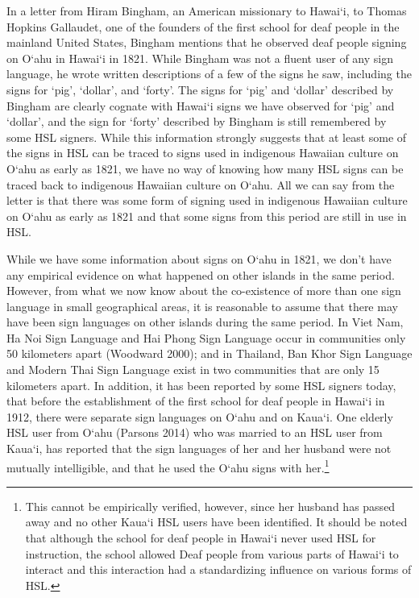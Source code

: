 \documentclass{tufte-book}
\begin{document}
In a letter from Hiram Bingham, an American missionary to Hawai‘i, to Thomas Hopkins Gallaudet, one of the founders of the first school for deaf people in the mainland United States, Bingham mentions that he observed deaf people signing on O‘ahu in Hawai‘i in 1821. While Bingham was not a fluent user of any sign language, he wrote written descriptions of a few of the signs he saw, including the signs for `pig', `dollar', and `forty'. The signs for `pig' and `dollar' described by Bingham are clearly cognate with Hawai‘i signs we have observed for `pig' and `dollar', and the sign for `forty' described by Bingham is still remembered by some HSL signers. While this information strongly suggests that at least some of the signs in HSL can be traced to signs used in indigenous Hawaiian culture on O‘ahu as early as 1821, we have no way of knowing how many HSL signs can be traced back to indigenous Hawaiian culture on O‘ahu. All we can say from the letter is that there was some form of signing used in indigenous Hawaiian culture on O‘ahu as early as 1821 and that some signs from this period are still in use in HSL.


While we have some information about signs on O‘ahu in 1821, we don’t have any empirical evidence on what happened on other islands in the same period. However, from what we now know about the co-existence of more than one sign language in small geographical areas, it is reasonable to assume that there may have been sign languages on other islands during the same period. In Viet Nam, Ha Noi Sign Language and Hai Phong Sign Language occur in communities only 50 kilometers apart (Woodward 2000); and in Thailand, Ban Khor Sign Language and Modern Thai Sign Language exist in two communities that are only 15 kilometers apart. In addition, it has been reported by some HSL signers today, that before the establishment of the first school for deaf people in Hawai‘i in 1912, there were separate sign languages on O‘ahu and on Kaua`i. One elderly HSL user from O‘ahu (Parsons 2014) who was married to an HSL user from Kaua`i, has reported that the sign languages of her and her husband were not mutually intelligible, and that he used the O‘ahu signs with her.\footnote{This cannot be empirically verified, however, since her husband has passed away and no other Kaua`i HSL users have been identified. It should be noted that although the school for deaf people in Hawai‘i never used HSL for instruction, the school allowed Deaf people from various parts of Hawai‘i to interact and this interaction had a standardizing influence on various forms of HSL.}
\end{document}
